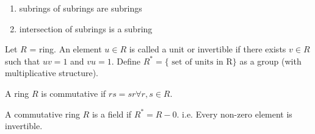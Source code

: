\begin{proposition}
    \begin{enumerate}
        \item subrings of subrings are subrings
        \item intersection of subrings is a subring
    \end{enumerate}
\end{proposition}

\begin{prop-defn}[Units]
Let \(R\) = ring. An element \(u \in R\) is called a unit or invertible if there exists \(v \in R\) such that \(uv = 1\) and \(vu = 1\). Define \(R^* = \{\text{ set of units in R}\}\) as a group (with multiplicative structure).
\end{prop-defn}


\begin{definition}
    A ring \(R\) is commutative if \(rs = sr \forall r,s \in R\).
\end{definition}

\begin{definition}[Fields]
    A commutative ring \(R\) is a field if \(R^* = R - 0\). i.e. Every non-zero element is invertible.
\end{definition}